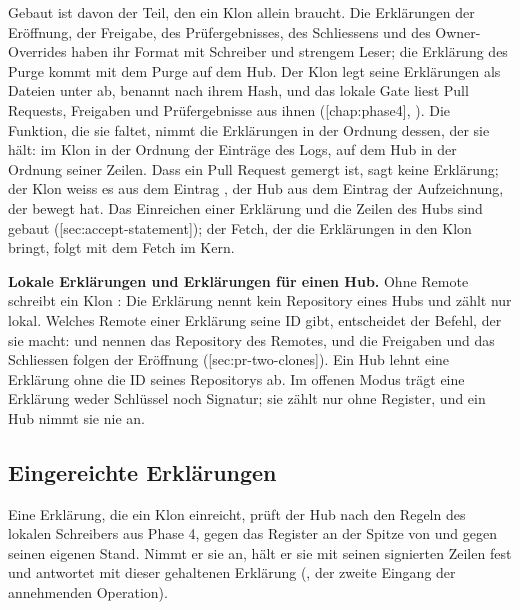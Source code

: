 Gebaut ist davon der Teil, den ein Klon allein braucht.
Die Erklärungen der Eröffnung, der Freigabe, des Prüfergebnisses, des Schliessens und des
Owner-Overrides haben ihr Format mit Schreiber und strengem Leser; die Erklärung des Purge kommt
mit dem Purge auf dem Hub.
Der Klon legt seine Erklärungen als Dateien unter  ab, benannt nach
ihrem Hash, und das lokale Gate liest Pull Requests, Freigaben und Prüfergebnisse aus ihnen
([chap:phase4], ).
Die Funktion, die sie faltet, nimmt die Erklärungen in der Ordnung dessen, der sie hält: im
Klon in der Ordnung der Einträge des Logs, auf dem Hub in der Ordnung seiner Zeilen.
Dass ein Pull Request gemergt ist, sagt keine Erklärung; der Klon weiss es aus dem Eintrag
, der Hub aus dem Eintrag der Aufzeichnung, der  bewegt hat.
Das Einreichen einer Erklärung und die Zeilen des Hubs sind gebaut
([sec:accept-statement]); der Fetch, der die Erklärungen in den Klon bringt,
folgt mit dem Fetch im Kern.

\startinfobox
{\bf Lokale Erklärungen und Erklärungen für einen Hub.}
Ohne Remote schreibt ein Klon : Die Erklärung nennt kein Repository eines
Hubs und zählt nur lokal.
Welches Remote einer Erklärung seine ID gibt, entscheidet der Befehl, der sie macht:
 und  nennen das Repository des Remotes, und
die Freigaben und das Schliessen folgen der Eröffnung ([sec:pr-two-clones]).
Ein Hub lehnt eine Erklärung ohne die ID seines Repositorys ab.
Im offenen Modus trägt eine Erklärung weder Schlüssel noch Signatur; sie zählt nur ohne
Register,
und ein Hub nimmt sie nie an.
\stopinfobox

\subsection[sec:accept-statement]{Eingereichte Erklärungen}

Eine Erklärung, die ein Klon einreicht, prüft der Hub nach den Regeln des lokalen Schreibers
aus Phase 4, gegen das Register an der Spitze von  und gegen seinen eigenen Stand.
Nimmt er sie an, hält er sie mit seinen signierten Zeilen fest und antwortet mit dieser
gehaltenen Erklärung (, der zweite Eingang der annehmenden Operation).

